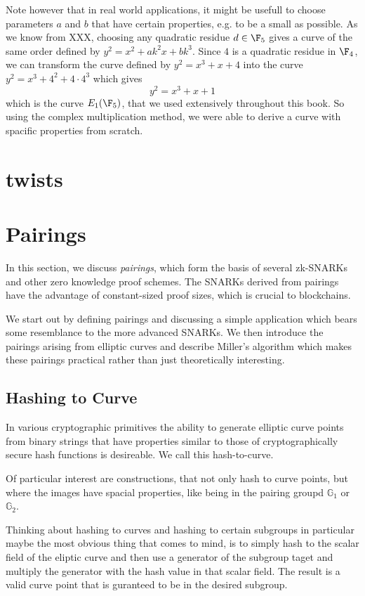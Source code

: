 \begin{example}
Note however that in real world applications, it might be usefull to choose parameters $a$ and $b$ that have certain properties, e.g. to be a small as possible. As we know from XXX, choosing any quadratic residue $d\in \F_5$ gives a curve of the same order defined by $y^2 = x^2 + a k^2 x + bk^3$. Since $4$ is a quadratic residue in $\F_4$, we can transform the curve defined by 
$y^2 = x^3 +x+4$ into the curve $y^2 = x^3 + 4^2 + 4\cdot 4^3$ which gives 
$$
y^2 = x^3 + x +1
$$
which is the curve $E_1(\F_5)$, that we used extensively throughout this book. So using the complex multiplication method, we were able to derive a curve with spacific properties from scratch.
\end{example}


\section{twists}

\section{Pairings}
In this section, we discuss \textit{pairings}, which form the basis of several zk-SNARKs and other zero knowledge proof schemes. The SNARKs derived from pairings have the advantage of constant-sized proof sizes, which is crucial to blockchains. 

We start out by defining pairings and discussing a simple application which bears some resemblance to the more advanced SNARKs. We then introduce the pairings arising from elliptic curves and describe Miller's algorithm which makes these pairings practical rather than just theoretically interesting.

\subsection{Hashing to Curve}
In various cryptographic primitives the ability to generate elliptic curve points from binary strings that have properties similar to those of cryptographically secure hash functions is desireable. We call this hash-to-curve.

Of particular interest are constructions, that not only hash to curve points, but where the images have spacial properties, like being in the pairing groupd $\mathbb{G}_1$ or $\mathbb{G}_2$.

Thinking about hashing to curves and hashing to certain subgroups in particular maybe the most obvious thing that comes to mind, is to simply hash to the scalar field of the eliptic curve and then use a generator of the subgroup taget and multiply the generator with the hash value in that scalar field. The result is a valid curve point that is guranteed to be in the desired subgroup. 


